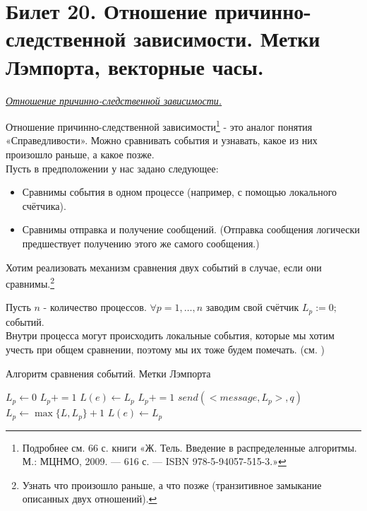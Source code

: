 \newpage
\section{Билет 20. Отношение причинно-следственной зависимости. Метки Лэмпорта, векторные часы.}\label{b20}
\begin{center}
    \textit{\underline{Отношение причинно-следственной зависимости.}}
\end{center}
 Отношение причинно-следственной зависимости\footnote{Подробнее см. 66 с. книги «Ж. Тель. Введение в распределенные алгоритмы. М.: МЦНМО, 2009. — 616 с. — ISBN 978-5-94057-515-3.»} - это аналог понятия  «Справедливости». Можно сравнивать события и узнавать, какое из них произошло раньше, а какое позже. \\ 
Пусть в предположении у нас задано следующее:
\begin{itemize}
\item Сравнимы события в одном процессе (например, с помощью локального счётчика).
\item Сравнимы отправка и получение сообщений. (Отправка сообщения логически предшествует получению этого же самого сообщения.)
\end{itemize}
Хотим реализовать механизм сравнения двух событий в случае, если они сравнимы.\footnote{Узнать что произошло раньше, а что позже (транзитивное замыкание описанных двух отношений).}

Пусть $n$ - количество процессов. $\forall p = 1, \ldots, n$ заводим свой счётчик $L_p := 0;$ событий.\\
Внутри процесса могут происходить локальные события, которые мы хотим учесть при общем сравнении, поэтому мы их тоже будем помечать. (см. )

\begin{algorithm}
\caption{Алгоритм сравнения событий. Метки Лэмпорта}
\label{algComparison}
\begin{algorithmic}
\State $L_p \gets 0$
{}
    \State $L_p += 1$
    \State $L(e) \gets L_p$ 
\EndIf
{}
    \State $L_p += 1$
    \State $send(<message, L_p>, q)$ 
\EndIf
{}
    \State $L_p \gets \max\{L,L_p\} + 1$
    \State $L(e) \gets L_p$ 
\EndIf
\EndFunction
\end{algorithmic}
\end{algorithm}

